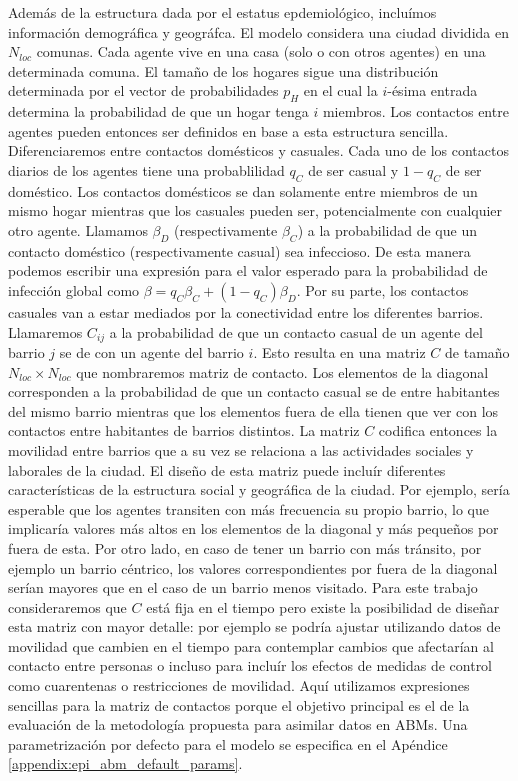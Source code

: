 Además de la estructura dada por el estatus epdemiológico, incluímos información demográfica y geográfca. El modelo considera una ciudad dividida en $N_{loc}$ comunas. Cada agente vive en una casa (solo o con otros agentes) en una determinada comuna. El tamaño de los hogares sigue una distribución determinada por el vector de probabilidades $p_H$ en el cual la $i$-ésima entrada determina la probabilidad de que un hogar tenga $i$ miembros. Los contactos entre agentes pueden entonces ser definidos en base a esta estructura sencilla. Diferenciaremos entre contactos domésticos y casuales. Cada uno de los contactos diarios de los agentes tiene una probablilidad $q_C$ de ser casual y $1 - q_C$ de ser doméstico. Los contactos domésticos se dan solamente entre miembros de un mismo hogar mientras que los casuales pueden ser, potencialmente con cualquier otro agente. Llamamos $\beta_D$ (respectivamente $\beta_C$) a la probabilidad de que un contacto doméstico (respectivamente casual) sea infeccioso. De esta manera podemos escribir una expresión para el valor esperado para la probabilidad de infección global como $\beta = q_C \beta_C + (1 - q_C) \beta_D$. Por su parte, los contactos casuales van a estar mediados por la conectividad entre los diferentes barrios. Llamaremos $C_{ij}$ a la probabilidad de que un contacto casual de un agente del barrio $j$ se de con un agente del barrio $i$. Esto resulta en una matriz $C$ de tamaño $N_{loc} \times N_{loc}$ que nombraremos matriz de contacto. Los elementos de la diagonal corresponden a la probabilidad de que un contacto casual se de entre habitantes del mismo barrio mientras que los elementos fuera de ella tienen que ver con los contactos entre habitantes de barrios distintos. La matriz $C$ codifica entonces la movilidad entre barrios que a su vez se relaciona a las actividades sociales y laborales de la ciudad. El diseño de esta matriz puede incluír diferentes características de la estructura social y geográfica de la ciudad. Por ejemplo, sería esperable que los agentes transiten con más frecuencia su propio barrio, lo que implicaría valores más altos en los elementos de la diagonal y más pequeños por fuera de esta. Por otro lado, en caso de tener un barrio con más tránsito, por ejemplo un barrio céntrico, los valores correspondientes por fuera de la diagonal serían mayores que en el caso de un barrio menos visitado. Para este trabajo consideraremos que $C$ está fija en el tiempo pero existe la posibilidad de diseñar esta matriz con mayor detalle: por ejemplo se podría ajustar utilizando datos de movilidad que cambien en el tiempo para contemplar cambios que afectarían al contacto entre personas o incluso para incluír los efectos de medidas de control como cuarentenas o restricciones de movilidad. Aquí utilizamos expresiones sencillas para la matriz de contactos porque el objetivo principal es el de la evaluación de la metodología propuesta para asimilar datos en ABMs. Una parametrización por defecto para el modelo se especifica en el Apéndice \ref{appendix:epi_abm_default_params}.

